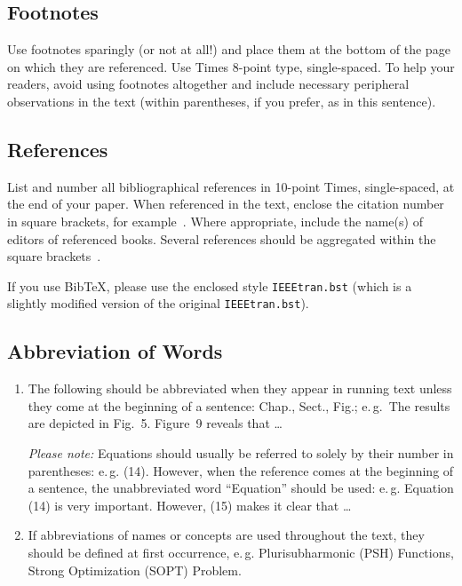 \documentclass[a4paper,twoside]{arlims}
\begin{document}
\subsection{Footnotes}
\label{sect:Footnotes}

Use footnotes sparingly (or not at all!) and place them at the bottom
of the page on which they are referenced. Use Times 8-point type,
single-spaced. To help your readers, avoid using footnotes altogether
and include necessary peripheral observations in the text (within
parentheses, if you prefer, as in this sentence).

\subsection{References}
\label{sect:References}

List and number all bibliographical references in 10-point Times,
single-spaced, at the end of your paper.  When referenced in the text,
enclose the citation number in square brackets, for
example~\cite{FuzzyForCarLikeRobots}. Where appropriate, include the
name(s) of editors of referenced books. Several references should be
aggregated within the square
brackets~\cite{FuzzyForCarLikeRobots,other-reference}.

If you use Bib\TeX, please use the enclosed style
\texttt{IEEEtran.bst} (which is a slightly modified version of the
original \texttt{IEEEtran.bst}).

\subsection{Abbreviation of Words}
\label{sect:Abbreviations}

\begin{enumerate}
  \item The following should be abbreviated when they appear in
  running text unless they come at the beginning of a sentence: Chap.,
  Sect., Fig.; e.\,g.\ The results are depicted in Fig.~5. Figure~9
  reveals that \ldots

  \emph{Please note:} Equations should usually be referred to solely by their
  number in parentheses: e.\,g. (14).  However, when the reference
  comes at the beginning of a sentence, the unabbreviated word
  ``Equation'' should be used: e.\,g. Equation (14) is very important.
  However, (15) makes it clear that \ldots

  \item If abbreviations of names or concepts are used throughout the
  text, they should be defined at first occurrence, e.\,g.
  Plurisubharmonic (PSH) Functions, Strong Optimization (SOPT)
  Problem.
\end{enumerate}
\end{document}
